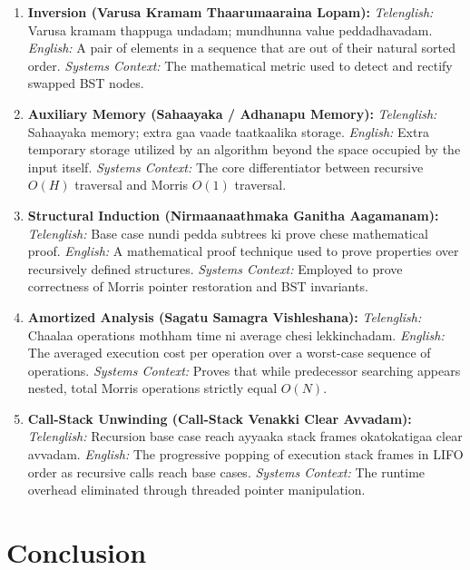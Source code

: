 \documentclass[10pt,twocolumn,letterpaper]{article}
\begin{document}
\begin{enumerate}
    \item \textbf{Inversion (Varusa Kramam Thaarumaaraina Lopam):}
    \textit{Telenglish:} Varusa kramam thappuga undadam; mundhunna value peddadhavadam.
    \textit{English:} A pair of elements in a sequence that are out of their natural sorted order.
    \textit{Systems Context:} The mathematical metric used to detect and rectify swapped BST nodes.

    \item \textbf{Auxiliary Memory (Sahaayaka / Adhanapu Memory):}
    \textit{Telenglish:} Sahaayaka memory; extra gaa vaade taatkaalika storage.
    \textit{English:} Extra temporary storage utilized by an algorithm beyond the space occupied by the input itself.
    \textit{Systems Context:} The core differentiator between recursive $O(H)$ traversal and Morris $O(1)$ traversal.

    \item \textbf{Structural Induction (Nirmaanaathmaka Ganitha Aagamanam):}
    \textit{Telenglish:} Base case nundi pedda subtrees ki prove chese mathematical proof.
    \textit{English:} A mathematical proof technique used to prove properties over recursively defined structures.
    \textit{Systems Context:} Employed to prove correctness of Morris pointer restoration and BST invariants.

    \item \textbf{Amortized Analysis (Sagatu Samagra Vishleshana):}
    \textit{Telenglish:} Chaalaa operations mothham time ni average chesi lekkinchadam.
    \textit{English:} The averaged execution cost per operation over a worst-case sequence of operations.
    \textit{Systems Context:} Proves that while predecessor searching appears nested, total Morris operations strictly equal $O(N)$.

    \item \textbf{Call-Stack Unwinding (Call-Stack Venakki Clear Avvadam):}
    \textit{Telenglish:} Recursion base case reach ayyaaka stack frames okatokatigaa clear avvadam.
    \textit{English:} The progressive popping of execution stack frames in LIFO order as recursive calls reach base cases.
    \textit{Systems Context:} The runtime overhead eliminated through threaded pointer manipulation.
\end{enumerate}

\section{Conclusion}
\label{sec:conclusion}
\end{document}
